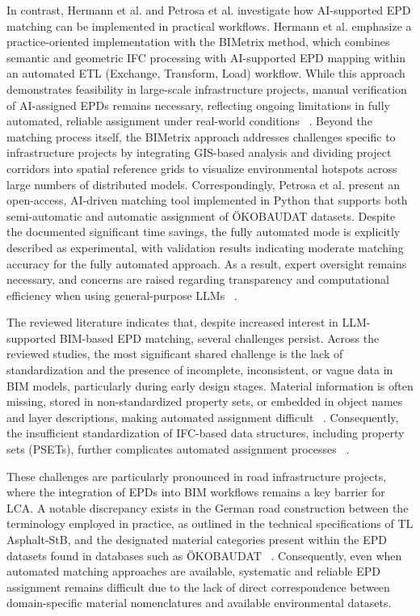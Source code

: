 \documentclass[10pt, a4paper, twocolumn]{article}
\begin{document}
In contrast, Hermann et al. and Petrosa et al. investigate how AI-supported EPD matching can be implemented in practical workflows. Hermann et al. emphasize a practice-oriented implementation with the BIMetrix method, which combines semantic and geometric IFC processing with AI-supported EPD mapping within an automated ETL (Exchange, Transform, Load) workflow. While this approach demonstrates feasibility in large-scale infrastructure projects, manual verification of AI-assigned EPDs remains necessary, reflecting ongoing limitations in fully automated, reliable assignment under real-world conditions ~\cite{Hermann.2024}. Beyond the matching process itself, the BIMetrix approach addresses challenges specific to infrastructure projects by integrating GIS-based analysis and dividing project corridors into spatial reference grids to visualize environmental hotspots across large numbers of distributed models. Correspondingly, Petrosa et al. present an open-access, AI-driven matching tool implemented in Python that supports both semi-automatic and automatic assignment of ÖKOBAUDAT datasets. Despite the documented significant time savings, the fully automated mode is explicitly described as experimental, with validation results indicating moderate matching accuracy for the fully automated approach. As a result, expert oversight remains necessary, and concerns are raised regarding transparency and computational efficiency when using general-purpose LLMs ~\cite{Petrosa.2025}.

The reviewed literature indicates that, despite increased interest in LLM-supported BIM-based EPD matching, several challenges persist. Across the reviewed studies, the most significant shared challenge is the lack of standardization and the presence of incomplete, inconsistent, or vague data in BIM models, particularly during early design stages. Material information is often missing, stored in non-standardized property sets, or embedded in object names and layer descriptions, making automated assignment difficult ~\cite{Forth.2023,Hermann.2024,J.HofmeyerK.ForthS.EsserA.Borrmann.,Petrosa.2025}. Consequently, the insufficient standardization of IFC-based data structures, including property sets (PSETs), further complicates automated assignment processes ~\cite{Wastiels.2019, PotrcObrecht.2020}.

These challenges are particularly pronounced in road infrastructure projects, where the integration of EPDs into BIM workflows remains a key barrier for LCA. A notable discrepancy exists in the German road construction between the terminology employed in practice, as outlined in the technical specifications of TL Asphalt-StB, and the designated material categories present within the EPD datasets found in databases such as ÖKOBAUDAT ~\cite{Kaus.2025}. Consequently, even when automated matching approaches are available, systematic and reliable EPD assignment remains difficult due to the lack of direct correspondence between domain-specific material nomenclatures and available environmental datasets. 
\end{document}
